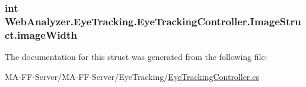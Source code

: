\subsubsection[{image\+Width}]{\setlength{\rightskip}{0pt plus 5cm}int Web\+Analyzer.\+Eye\+Tracking.\+Eye\+Tracking\+Controller.\+Image\+Struct.\+image\+Width}\label{struct_web_analyzer_1_1_eye_tracking_1_1_eye_tracking_controller_1_1_image_struct_ab4cbe360570340ca7b6dbe0e922c8e9b}


The documentation for this struct was generated from the following file\+:\begin{DoxyCompactItemize}
\item 
M\+A-\/\+F\+F-\/\+Server/\+M\+A-\/\+F\+F-\/\+Server/\+Eye\+Tracking/\hyperlink{_eye_tracking_controller_8cs}{Eye\+Tracking\+Controller.\+cs}\end{DoxyCompactItemize}
